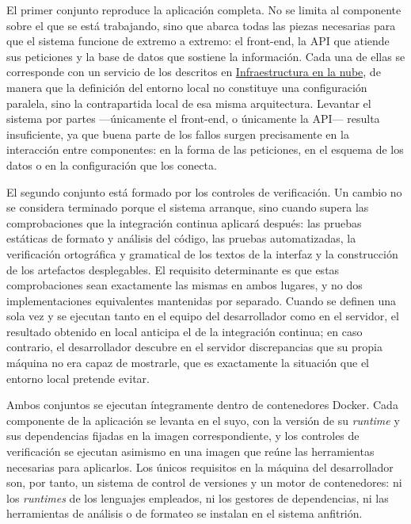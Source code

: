 El primer conjunto reproduce la aplicación completa. No se limita al componente
sobre el que se está trabajando, sino que abarca todas las piezas necesarias
para que el sistema funcione de extremo a extremo: el front-end, la API que
atiende sus peticiones y la base de datos que sostiene la información. Cada una
de ellas se corresponde con un servicio de los descritos en
\hyperref[sec:infraestructura]{Infraestructura en la nube}, de manera que la
definición del entorno local no constituye una configuración paralela, sino la
contrapartida local de esa misma arquitectura. Levantar el sistema por partes
—únicamente el front-end, o únicamente la API— resulta insuficiente, ya que
buena parte de los fallos surgen precisamente en la interacción entre
componentes: en la forma de las peticiones, en el esquema de los datos o en la
configuración que los conecta.

El segundo conjunto está formado por los controles de verificación. Un cambio no
se considera terminado porque el sistema arranque, sino cuando supera las
comprobaciones que la integración continua aplicará después: las pruebas
estáticas de formato y análisis del código, las pruebas automatizadas, la
verificación ortográfica y gramatical de los textos de la interfaz y la
construcción de los artefactos desplegables. El requisito determinante es que
estas comprobaciones sean exactamente las mismas en ambos lugares, y no dos
implementaciones equivalentes mantenidas por separado. Cuando se definen una
sola vez y se ejecutan tanto en el equipo del desarrollador como en el
servidor, el resultado obtenido en local anticipa el de la integración
continua; en caso contrario, el desarrollador descubre en el servidor
discrepancias que su propia máquina no era capaz de mostrarle, que es
exactamente la situación que el entorno local pretende evitar.

Ambos conjuntos se ejecutan íntegramente dentro de contenedores Docker. Cada
componente de la aplicación se levanta en el suyo, con la versión de su
\textit{runtime} y sus dependencias fijadas en la imagen correspondiente, y los
controles de verificación se ejecutan asimismo en una imagen que reúne las
herramientas necesarias para aplicarlos. Los únicos requisitos en la máquina del
desarrollador son, por tanto, un sistema de control de versiones y un motor de
contenedores: ni los \textit{runtimes} de los lenguajes empleados, ni los
gestores de dependencias, ni las herramientas de análisis o de formateo se
instalan en el sistema anfitrión.

